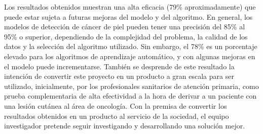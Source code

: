 \begin{conclusions}
    Los resultados obtenidos muestran una alta eficacia (79\% aproximadamente) que puede estar sujeta a futuras mejoras del modelo y del algoritmo. 
    En general, los modelos de detección de cáncer de piel pueden tener una precisión del 85\% al 95\% o superior, dependiendo de la complejidad del problema, la calidad de los datos y la selección del algoritmo utilizado. 
    Sin embargo, el 78\% es un porcentaje elevado para los algoritmos de aprendizaje automático, y con algunas mejoras en el modelo puede incrementarse. 
    También se desprende de este resultado la intención de convertir este proyecto en un producto a gran escala para ser utilizado, inicialmente, por los profesionales sanitarios de atención primaria, como prueba complementaria de alta efectividad a la hora de derivar a un paciente con una lesión cutánea al área de oncología. 
    Con la premisa de convertir los resultados obtenidos en un producto al servicio de la sociedad, el equipo investigador pretende seguir investigando y desarrollando una solución mejor.
\end{conclusions}
